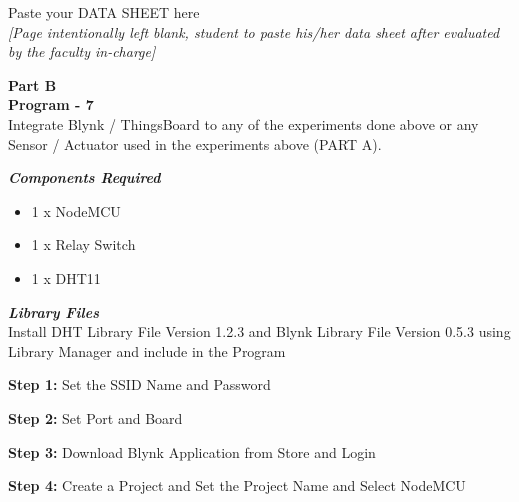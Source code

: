 \documentclass[12pt,a4paper]{article}
\begin{document}
Paste your DATA SHEET here\\
\textit{[Page intentionally left blank, student to paste his/her data sheet after evaluated by the faculty in-charge] }
\clearpage
\begin{center}
{\large \textbf{Part B}\\  {\textbf{Program - 7}}\\
Integrate Blynk / ThingsBoard to any of the experiments done above
or
any Sensor / Actuator used in the experiments above (PART A).}
\end{center}
\begin{flushleft}
\textbf{\textit{Components Required}}
\begin{itemize}[noitemsep,nolistsep]
\item 1 x NodeMCU
\item 1 x Relay Switch
\item 1 x DHT11
\end{itemize}
\vspace{5mm}

\textbf{\textit{Library Files}}\\ 
Install DHT Library File Version 1.2.3 and Blynk Library File Version 0.5.3 using Library Manager and include in the Program
\vspace{4mm}

\textbf{Step 1:} Set the SSID Name and Password\\
\vspace{4mm}

\textbf{Step 2:} Set Port and Board
\vspace{4mm}

\textbf{Step 3:} Download Blynk Application from Store and Login
\vspace{4mm}

\textbf{Step 4:} Create a Project and Set the Project Name and Select NodeMCU
\vspace{4mm}


\end{flushleft}
\end{document}
